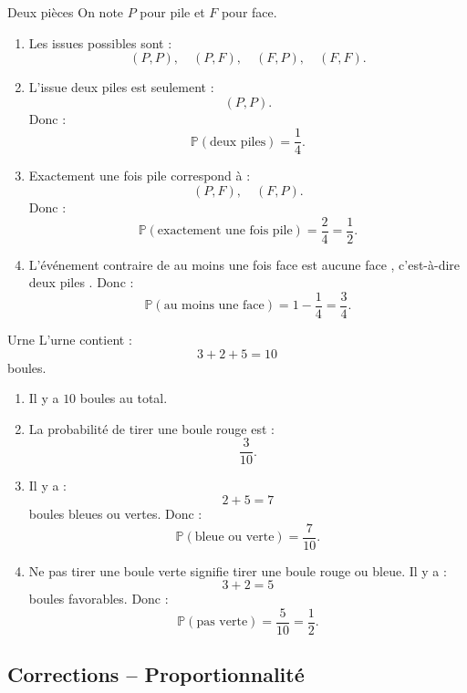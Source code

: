 \documentclass[11pt,a4paper]{article}
\newcommand{\Prob}{\mathbb{P}}
\begin{document}
\begin{correctionbox}{Deux pièces}
On note $P$ pour pile et $F$ pour face.

\begin{enumerate}
    \item Les issues possibles sont :
    \[
    (P,P),\quad (P,F),\quad (F,P),\quad (F,F).
    \]
    
    \item L'issue \og deux piles \fg{} est seulement :
    \[
    (P,P).
    \]
    Donc :
    \[
    \Prob(\text{deux piles})=\frac{1}{4}.
    \]
    
    \item Exactement une fois pile correspond à :
    \[
    (P,F),\quad (F,P).
    \]
    Donc :
    \[
    \Prob(\text{exactement une fois pile})=\frac{2}{4}=\frac{1}{2}.
    \]
    
    \item L'événement contraire de \og au moins une fois face \fg{} est \og aucune face \fg, c'est-à-dire \og deux piles \fg.
    Donc :
    \[
    \Prob(\text{au moins une face})=1-\frac{1}{4}=\frac{3}{4}.
    \]
\end{enumerate}
\end{correctionbox}

\begin{correctionbox}{Urne}
L'urne contient :
\[
3+2+5=10
\]
boules.

\begin{enumerate}
    \item Il y a $10$ boules au total.
    
    \item La probabilité de tirer une boule rouge est :
    \[
    \frac{3}{10}.
    \]
    
    \item Il y a :
    \[
    2+5=7
    \]
    boules bleues ou vertes.
    Donc :
    \[
    \Prob(\text{bleue ou verte})=\frac{7}{10}.
    \]
    
    \item Ne pas tirer une boule verte signifie tirer une boule rouge ou bleue.
    Il y a :
    \[
    3+2=5
    \]
    boules favorables.
    Donc :
    \[
    \Prob(\text{pas verte})=\frac{5}{10}=\frac{1}{2}.
    \]
\end{enumerate}
\end{correctionbox}

\subsection{Corrections -- Proportionnalité}
\end{document}
